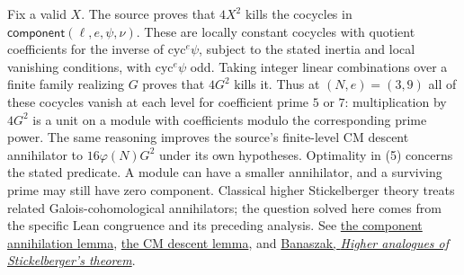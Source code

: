 Fix a valid $X$. The source proves that $4X^2$ kills the cocycles in $\mathsf{component}(\ell,e,\psi,\nu)$. These are locally constant cocycles with quotient coefficients for the inverse of $\mathrm{cyc}^e\psi$, subject to the stated inertia and local vanishing conditions, with $\mathrm{cyc}^e\psi$ odd. Taking integer linear
combinations over a finite family realizing $G$ proves that $4G^2$
kills it. Thus at $(N,e)=(3,9)$ all of these cocycles vanish at each level
for coefficient prime $5$ or $7$: multiplication by $4G^2$ is a unit
on a module with coefficients modulo the corresponding prime power.
The same reasoning improves the source's finite-level CM descent
annihilator to $16\varphi(N)G^2$ under its own hypotheses. Optimality
in (5) concerns the stated predicate. A module can have a smaller
annihilator, and a surviving prime may still have zero component.
Classical higher Stickelberger theory treats related Galois-cohomological
annihilators; the question solved here comes from the specific Lean
congruence and its preceding analysis.
See
\href{https://github.com/lsernau/grh-lean/blob/72fead102f663d5c7a407964a13dc0cf9d977207/grh/src/Lib/Cyclotomic/Kolyvagin/ReciprocityComponentBounds.lean\#L670-L680}{the component annihilation lemma},
\href{https://github.com/lsernau/grh-lean/blob/72fead102f663d5c7a407964a13dc0cf9d977207/grh/src/Lib/Cyclotomic/OddSha.lean\#L529-L545}{the CM descent lemma},
and \href{https://doi.org/10.1016/j.crma.2003.09.019}{Banaszak, \emph{Higher analogues of Stickelberger's theorem}}.
